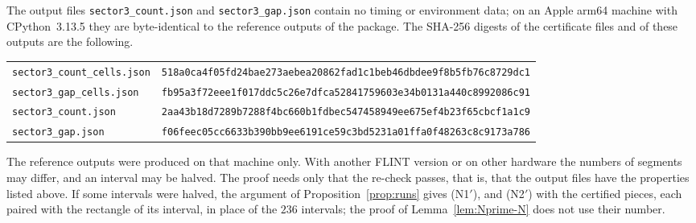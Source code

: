The output files \texttt{sector3\_count.json} and \texttt{sector3\_gap.json}
contain no timing or environment data; on an Apple arm64 machine with
CPython~3.13.5 they are byte-identical to the reference outputs of the package.
The SHA-256 digests of the certificate files and of these outputs are the following.
\begin{center}
\scriptsize
\begin{tabular}{ll}
\texttt{sector3\_count\_cells.json} &
\texttt{518a0ca4f05fd24bae273aebea20862fad1c1beb46dbdee9f8b5fb76c8729dc1}\\
\texttt{sector3\_gap\_cells.json} &
\texttt{fb95a3f72eee1f017ddc5c26e7dfca52841759603e34b0131a440c8992086c91}\\
\texttt{sector3\_count.json} &
\texttt{2aa43b18d7289b7288f4bc660b1fdbec547458949ee675ef4b23f65cbcf1a1c9}\\
\texttt{sector3\_gap.json} &
\texttt{f06feec05cc6633b390bb9ee6191ce59c3bd5231a01ffa0f48263c8c9173a786}
\end{tabular}
\end{center}
The reference outputs were produced on that machine only. With another FLINT
version or on other hardware the numbers of segments may differ, and an interval
may be halved. The proof needs only that the re-check passes, that is, that the output files
have the properties listed above. If some intervals
were halved, the argument of Proposition~\ref{prop:runs} gives \textup{(N1$'$)},
and \textup{(N2$'$)} with the certified pieces, each paired with the rectangle of
its interval, in place of the $236$ intervals; the proof of
Lemma~\ref{lem:Nprime-N} does not use their number.
